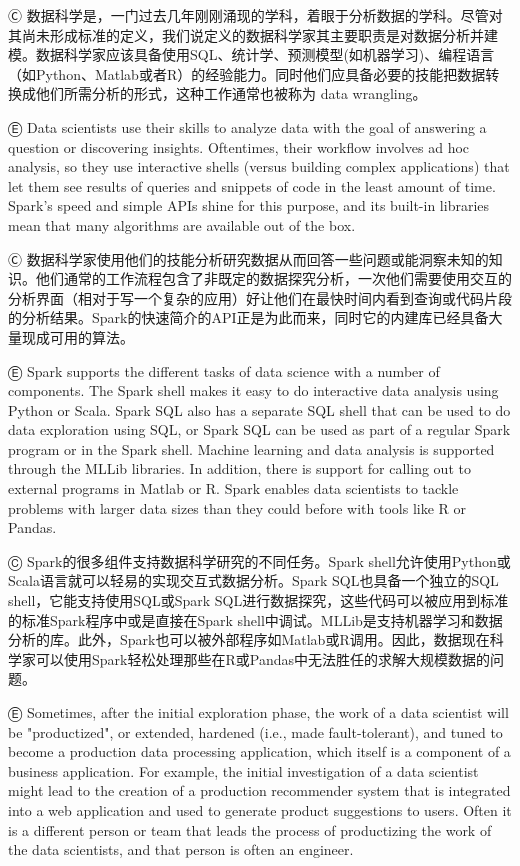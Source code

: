Ⓒ 数据科学是，一门过去几年刚刚涌现的学科，着眼于分析数据的学科。尽管对其尚未形成标准的定义，我们说定义的数据科学家其主要职责是对数据分析并建模。数据科学家应该具备使用SQL、统计学、预测模型(如机器学习)、编程语言（如Python、Matlab或者R）的经验能力。同时他们应具备必要的技能把数据转换成他们所需分析的形式，这种工作通常也被称为 data wrangling。

Ⓔ \textcolor{etc}{Data scientists use their skills to analyze data with the goal of answering a question or discovering insights. Oftentimes, their workflow involves ad hoc analysis, so they use interactive shells (versus building complex applications) that let them see results of queries and snippets of code in the least amount of time. Spark's speed and simple APIs shine for this purpose, and its built-in libraries mean that many algorithms are available out of the box.}

Ⓒ 数据科学家使用他们的技能分析研究数据从而回答一些问题或能洞察未知的知识。他们通常的工作流程包含了非既定的数据探究分析，一次他们需要使用交互的分析界面（相对于写一个复杂的应用）好让他们在最快时间内看到查询或代码片段的分析结果。Spark的快速简介的API正是为此而来，同时它的内建库已经具备大量现成可用的算法。

Ⓔ \textcolor{etc}{Spark supports the different tasks of data science with a number of components. The Spark shell makes it easy to do interactive data analysis using Python or Scala. Spark SQL also has a separate SQL shell that can be used to do data exploration using SQL, or Spark SQL can be used as part of a regular Spark program or in the Spark shell. Machine learning and data analysis is supported through the MLLib libraries. In addition, there is support for calling out to external programs in Matlab or R. Spark enables data scientists to tackle problems with larger data sizes than they could before with tools like R or Pandas.}

Ⓒ Spark的很多组件支持数据科学研究的不同任务。Spark shell允许使用Python或Scala语言就可以轻易的实现交互式数据分析。Spark SQL也具备一个独立的SQL shell，它能支持使用SQL或Spark SQL进行数据探究，这些代码可以被应用到标准的标准Spark程序中或是直接在Spark shell中调试。MLLib是支持机器学习和数据分析的库。此外，Spark也可以被外部程序如Matlab或R调用。因此，数据现在科学家可以使用Spark轻松处理那些在R或Pandas中无法胜任的求解大规模数据的问题。

Ⓔ \textcolor{etc}{Sometimes, after the initial exploration phase, the work of a data scientist will be "productized", or extended, hardened (i.e., made fault-tolerant), and tuned to become a production data processing application, which itself is a component of a business application. For example, the initial investigation of a data scientist might lead to the creation of a production recommender system that is integrated into a web application and used to generate product suggestions to users. Often it is a different person or team that leads the process of productizing the work of the data scientists, and that person is often an engineer.}

